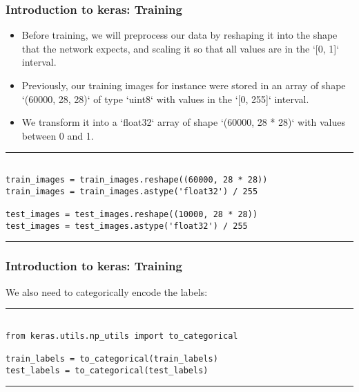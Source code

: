 \documentclass[11pt]{beamer}
\begin{document}
\begin{frame}[fragile]
\frametitle{Introduction to keras: Training}
\scriptsize

	\begin{itemize}
	\item 
Before training, we will preprocess our data by reshaping it into the shape that the network expects, and scaling it so that all values are in 
the `[0, 1]` interval. 
\item Previously, our training images for instance were stored in an array of shape `(60000, 28, 28)` of type `uint8` with 
values in the `[0, 255]` interval. 
\item We transform it into a `float32` array of shape `(60000, 28 * 28)` with values between 0 and 1.
	\end{itemize}
\rule{\textwidth}{1pt}
\begin{verbatim}

train_images = train_images.reshape((60000, 28 * 28))
train_images = train_images.astype('float32') / 255

test_images = test_images.reshape((10000, 28 * 28))
test_images = test_images.astype('float32') / 255

\end{verbatim}
\rule{\textwidth}{1pt}
\end{frame}
\begin{frame}[fragile]
\frametitle{Introduction to keras: Training}

We also need to categorically encode the labels:

\rule{\textwidth}{1pt}
\begin{verbatim}

from keras.utils.np_utils import to_categorical

train_labels = to_categorical(train_labels)
test_labels = to_categorical(test_labels)

\end{verbatim}
\rule{\textwidth}{1pt}
\end{frame}
\end{document}
